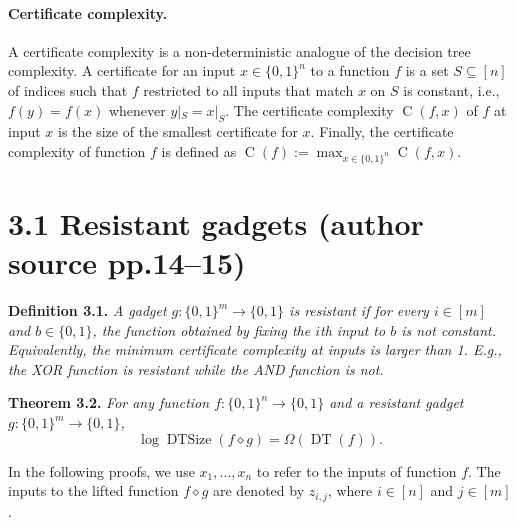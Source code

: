 \documentclass[10pt,a4paper]{article}
\newcommand{\bits}{\{0,1\}}
\newcommand{\DT}{\operatorname{DT}}
\newcommand{\DTSize}{\operatorname{DTSize}}
\newcommand{\CC}{\operatorname C}
\newcommand{\comp}{\diamond}
\newenvironment{originalresult}[1]{\par\medskip\noindent\textbf{#1.}\itshape}{\par\medskip}
\begin{document}
\paragraph{Certificate complexity.} A certificate complexity is a non-deterministic analogue of the decision tree complexity. A certificate for an input $x\in\bits^n$ to a function $f$ is a set $S\subseteq[n]$ of indices such that $f$ restricted to all inputs that match $x$ on $S$ is constant, i.e., $f(y)=f(x)$ whenever $y|_S=x|_S$. The certificate complexity $\CC(f,x)$ of $f$ at input $x$ is the size of the smallest certificate for $x$. Finally, the certificate complexity of function $f$ is defined as $\CC(f):=\max_{x\in\bits^n}\CC(f,x)$.

\section*{3.1 Resistant gadgets (author source pp.14--15)}
\begin{originalresult}{Definition 3.1}
A gadget $g:\bits^m\to\bits$ is resistant if for every $i\in[m]$ and $b\in\bits$, the function obtained by fixing the $i$th input to $b$ is not constant. Equivalently, the minimum certificate complexity at inputs is larger than 1. E.g., the XOR function is resistant while the AND function is not.
\end{originalresult}
\begin{originalresult}{Theorem 3.2}
For any function $f:\bits^n\to\bits$ and a resistant gadget $g:\bits^m\to\bits$,
\[\log\DTSize(f\comp g)=\Omega(\DT(f)).\]
\end{originalresult}
In the following proofs, we use $x_1,\ldots,x_n$ to refer to the inputs of function $f$. The inputs to the lifted function $f\comp g$ are denoted by $z_{i,j}$, where $i\in[n]$ and $j\in[m]$.
\end{document}
